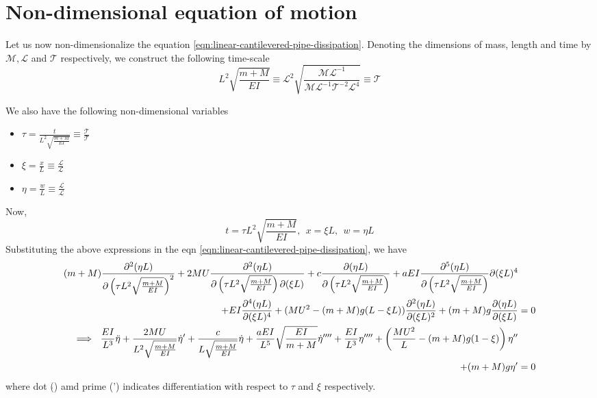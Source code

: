 \documentclass[12pt]{report}
\begin{document}
\section{Non-dimensional equation of motion}
Let us now non-dimensionalize the equation \ref{eqn:linear-cantilevered-pipe-dissipation}. Denoting the dimensions of mass, length and time by $\mathcal{M}, \mathcal{L}$ and $\mathcal{T}$ respectively, we construct the following time-scale
$$L^2\sqrt{\frac{m + M}{EI}} \equiv \mathcal{L}^2\sqrt{\frac{\mathcal{M}\mathcal{L}^{-1}}{\mathcal{M}\mathcal{L}^{-1}\mathcal{T}^{-2}\mathcal{L}^4}} \equiv \mathcal{T}$$

We also have the following non-dimensional variables
\begin{itemize}
	\item $\tau = \frac{t}{{L^2}\sqrt{\frac{m + M}{EI}}} \equiv \frac{\mathcal{T}}{\mathcal{T}}$
	
	\item $\xi = \frac{x}{L} \equiv \frac{\mathcal{L}}{\mathcal{L}}$
	\item $\eta = \frac{w}{L} \equiv \frac{\mathcal{L}}{\mathcal{L}}$ 
\end{itemize}
Now, 
$$t = \tau L^2\sqrt{\frac{m + M}{EI}}, ~~ x = \xi L,~~ w = \eta L$$
Substituting the above expressions in the eqn \ref{eqn:linear-cantilevered-pipe-dissipation}, we have 
\begin{align*}
(m + M) \pdv[2]{(\eta L)}{\left(\tau L^2\sqrt{\frac{m + M}{EI}}\right) } + 2MU \pdv[2]{(\eta L)}{\left(\tau L^2\sqrt{\frac{m + M}{EI}}\right)}{(\xi L)} + c\pdv{(\eta L)}{\left(\tau L^2\sqrt{\frac{m + M}{EI}}\right)}  +  aEI \frac{\partial^5 (\eta L)}{\partial\left(\tau L^2\sqrt{\frac{m + M}{EI}}\right)}{\partial (\xi L)^4} & \\
 + EI \pdv[4]{(\eta L)}{(\xi L)} +  (MU^2 - (m + M)g(L - \xi L))\pdv[2]{(\eta L)}{(\xi L)} + (m + M)g \pdv{(\eta L)}{(\xi L)}  &= 0 \\
\implies ~ \frac{EI}{L^3} \ddot{\eta} + \frac{2MU}{L^2\sqrt{\frac{m + M}{EI}}} \dot{\eta}' + \frac{c}{L\sqrt{\frac{m + M}{EI}}}\dot{\eta}  +  \frac{aEI}{L^5}\sqrt{\frac{EI}{m + M}} \dot{\eta}'''' + \frac{EI}{L^3} \eta''''  +  \left(\frac{MU^2}{L} - (m + M)g(1 - \xi)\right)\eta'' &\\ + (m + M)g\eta'  &= 0
\end{align*}
where  dot ($\dot{}$) amd prime (') indicates differentiation with respect to $\tau$ and $\xi$ respectively.
\end{document}
